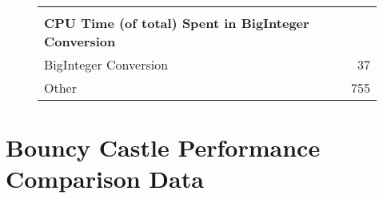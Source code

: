 \begin{figure}[h!]
\begin{tabular}{|l|r|}
	\hline
    \multicolumn{2}{|l|}{} \\
	\multicolumn{2}{|l|}{\textbf{CPU Time (of total) Spent in BigInteger Conversion}} \\
    \hline
	BigInteger Conversion & 37 \\
	Other & 755 \\
	\hline
\end{tabular}
\end{figure}

\section{Bouncy Castle Performance Comparison Data}
\label{app:bc-performance-data}